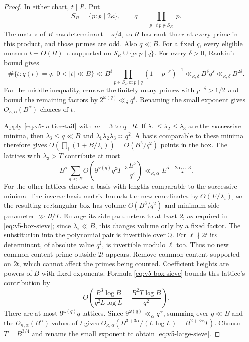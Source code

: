 \begin{proof}
In either chart, $t\mid R$. Put
\[
 S_R=\{p:p\mid2\kappa\},\qquad
 q=\prod_{\substack{p\mid t\ p\notin S_R}}p.
\]
The matrix of $R$ has determinant $-\kappa/4$, so $R$ has rank three
at every prime in this product, and those primes are odd. Also $q\ll B$.
For a fixed $q$, every eligible nonzero $t=O(B)$ is supported on
$S_R\cup\{p:p\mid q\}$. For every $\delta>0$, Rankin's bound gives
\[
 \#\{t:q(t)=q,\ 0<|t|\ll B\}
 \ll B^\delta
   \prod_{p\in S_R\ \text{or}\ p\mid q}(1-p^{-\delta})^{-1}
 \ll_{\kappa,\delta} B^\delta q^\delta
 \ll_{\kappa,\delta} B^{2\delta}.
\]
For the middle inequality, remove the finitely many primes with
$p^{-\delta}>1/2$ and bound the remaining factors by $2^{\omega(q)}
\ll_\delta q^\delta$. Renaming the small exponent gives
$O_{\kappa,\alpha}(B^\alpha)$ choices of $t$.

Apply \eqref{eq:v5-lattice-tail} with $m=3$ to $q\mid R$.
If $\lambda_1\leq\lambda_2\leq\lambda_3$ are the successive minima,
then $\lambda_3\leq q\ll B$ and
$\lambda_1\lambda_2\lambda_3\asymp q^2$.
A basis comparable to these minima therefore gives
$O(\prod_i(1+B/\lambda_i))=O(B^3/q^2)$ points in the box.
The lattices with $\lambda_3>T$ contribute at most
\[
 B^\alpha\sum_{q\ll B}
 O\left(9^{\omega(q)}q^3T^{-3}\frac{B^3}{q^2}\right)
 \ll_{\kappa,\alpha} B^{5+2\alpha}T^{-3}.
\]
For the other lattices choose a basis with lengths comparable to the
successive minima. The inverse basis matrix bounds the new coordinates by
$O(B/\lambda_i)$, so the resulting rectangular box has volume
$O(B^3/q^2)$ and minimum side parameter $\gg B/T$.
Enlarge its side parameters to at least $2$, as required in
\eqref{eq:v5-box-sieve}; since $\lambda_i\ll B$, this changes volume
only by a fixed factor.
The substitution into the polynomial pair is invertible over $\mathbb Q$.
For $\ell\nmid2t$ its determinant, of absolute value $q^2$, is invertible
modulo $\ell$ too. Thus no new common content prime outside $2t$ appears.
Remove common content supported on $2t$, which cannot affect the primes
being counted. Coefficient heights are powers of $B$ with fixed exponents.
Formula \eqref{eq:v5-box-sieve} bounds this lattice's contribution by
\[
 O\left(\frac{B^3\log B}{q^2L\log L}
                 +\frac{B^2T\log B}{q^2}\right).
\]
There are at most $9^{\omega(q)}q$ lattices. Since
$9^{\omega(q)}\ll_\alpha q^\alpha$, summing over $q\ll B$ and the
$O_{\kappa,\alpha}(B^\alpha)$ values of $t$ gives
$O_{\kappa,\alpha}(B^{3+3\alpha}/(L\log L)+B^{2+3\alpha}T)$.
Choose $T=B^{3/4}$ and rename the small exponent to obtain
\eqref{eq:v5-large-sieve}.
\end{proof}

